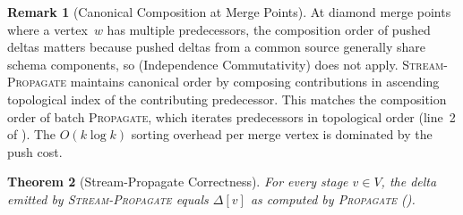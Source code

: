\documentclass[11pt,a4paper]{article}
\newtheorem{theorem}{Theorem}[section]
\theoremstyle{definition}
\newtheorem{remark}[theorem]{Remark}
\begin{document}
\begin{remark}[Canonical Composition at Merge Points]
At diamond merge points where a vertex~$w$ has multiple predecessors, the
composition order of pushed deltas matters because pushed deltas from a common
source generally share schema components, so
 (Independence Commutativity) does not apply.
\textsc{Stream-Propagate} maintains canonical order by composing contributions
in ascending topological index of the contributing predecessor.  This matches
the composition order of batch \textsc{Propagate}, which iterates predecessors
in topological order (line~2 of ).  The $O(k \log k)$
sorting overhead per merge vertex is dominated by the push cost.
\end{remark}

\begin{theorem}[Stream-Propagate Correctness]\label{thm:stream-correct}
For every stage $v \in V$, the delta emitted by \textsc{Stream-Propagate}
equals $\Delta[v]$ as computed by \textsc{Propagate} ().
\end{theorem}
\end{document}
